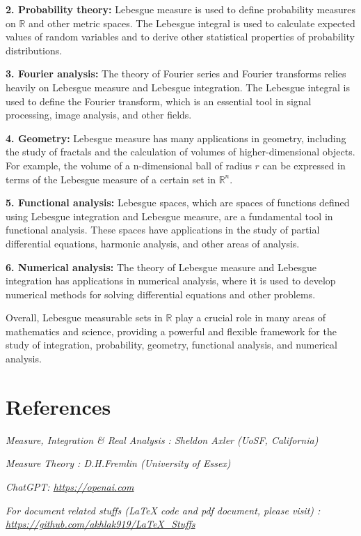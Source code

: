 \documentclass[12pt, a4paper]{article} %
\begin{document}
           
           {\bf 2. Probability theory:} Lebesgue measure is used to define probability measures on $\mathbb{R}$ and other metric spaces. The Lebesgue integral is used to calculate expected values of random variables and to derive other statistical properties of probability distributions.


           
           {\bf 3. Fourier analysis:} The theory of Fourier series and Fourier transforms relies heavily on Lebesgue measure and Lebesgue integration. The Lebesgue integral is used to define the Fourier transform, which is an essential tool in signal processing, image analysis, and other fields.


           
           {\bf 4. Geometry:} Lebesgue measure has many applications in geometry, including the study of fractals and the calculation of volumes of higher-dimensional objects. For example, the volume of a n-dimensional ball of radius $r$ can be expressed in terms of the Lebesgue measure of a certain set in $\mathbb{R}^n$.


           
           {\bf 5. Functional analysis:} Lebesgue spaces, which are spaces of functions defined using Lebesgue integration and Lebesgue measure, are a fundamental tool in functional analysis. These spaces have applications in the study of partial differential equations, harmonic analysis, and other areas of analysis.


           {\bf 6. Numerical analysis:} The theory of Lebesgue measure and Lebesgue integration has applications in numerical analysis, where it is used to develop numerical methods for solving differential equations and other problems.


           
           Overall, Lebesgue measurable sets in $\mathbb{R}$ play a crucial role in many areas of mathematics and science, providing a powerful and flexible framework for the study of integration, probability, geometry, functional analysis, and numerical analysis.


        \section{References}
           
           \textit{Measure, Integration \& Real Analysis : Sheldon Axler (UoSF, California)}

           \textit{Measure Theory : D.H.Fremlin (University of Essex)}

           \textit{ChatGPT: \url{https://openai.com}}

           \textit{For document related stuffs (LaTeX code and pdf document, please visit) : \url{https://github.com/akhlak919/LaTeX_Stuffs}}
     
\end{document}
